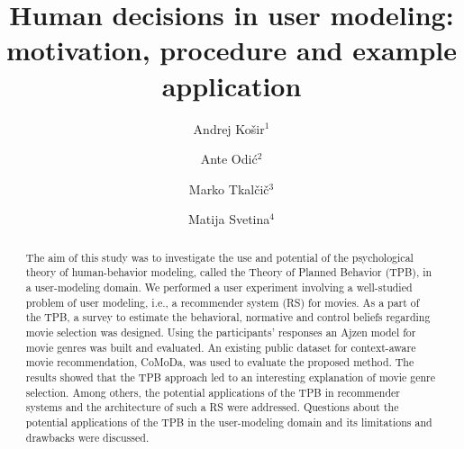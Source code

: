 \documentclass{llncs}
\begin{document}
\frontmatter  
{}
\mainmatter 

\title{Human decisions in user modeling: motivation, procedure and example application}

\author{Andrej Košir$^1$ \and Ante Odić$^2$ \and Marko Tkalčič$^3$ \and Matija Svetina$^4$}


  
\maketitle            

\begin{abstract}
The aim of this study was to investigate the use and potential of the psychological theory of human-behavior modeling, called the Theory of Planned Behavior (TPB), in a user-modeling domain. We performed a user experiment involving a well-studied problem of user modeling, i.e., a recommender system (RS) for movies. As a part of the TPB, a survey to estimate the behavioral, normative and control beliefs regarding movie selection was designed. Using the participants’ responses an Ajzen model for movie genres was built and evaluated. An existing public dataset for context-aware movie recommendation, CoMoDa, was used to evaluate the proposed method. The results showed that the TPB approach led to an interesting explanation of movie genre selection. Among others, the potential applications of the TPB in recommender systems and the architecture of such a RS were addressed. Questions about the potential applications of the TPB in the user-modeling domain and its limitations and drawbacks were discussed.
\end{abstract}
\end{document}
